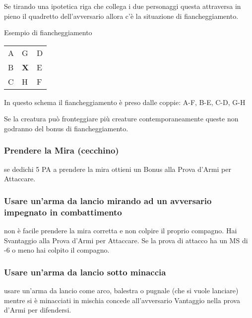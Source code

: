 \documentclass[12pt,a4paper,twoside,openany]{book}
\begin{document}
\begin{multicols}{2}
Se tirando una ipotetica riga che collega i due personaggi questa attraversa in pieno il quadretto dell'avversario allora c'è la situazione di fiancheggiamento.

\bigskip

Esempio di fiancheggiamento

\medskip

\begin{tabularx}{0.45\textwidth}{lll}
\toprule
A &  G &  D\\
B & \textbf{X}  &  E\\
C &  H &  F\\
\end{tabularx}

\bigskip

In questo schema il fiancheggiamento è preso dalle coppie: A-F, B-E, C-D, G-H

\bigskip

Se la creatura può fronteggiare più creature contemporaneamente queste non godranno del bonus di fiancheggiamento.


\subsubsection{Prendere la Mira (cecchino)} \label{cecchino}

se dedichi 5 PA a prendere la mira ottieni un Bonus alla Prova d'Armi per Attaccare.

\subsubsection{Usare un'arma da lancio mirando ad un avversario impegnato in combattimento} \label{usarearmalancioinmischia}

non è facile prendere la mira corretta e non colpire il proprio compagno. Hai Svantaggio alla Prova d'Armi per Attaccare. Se la prova di attacco ha un MS di -6 o meno hai colpito il compagno.

\subsubsection{Usare un'arma da lancio sotto minaccia} \label{usarearmalanciosottominaccia}

usare un'arma da lancio come arco, balestra o pugnale (che si vuole lanciare) mentre si è minacciati in mischia concede all'avversario Vantaggio nella prova d'Armi per difendersi.


\end{multicols}
\end{document}
